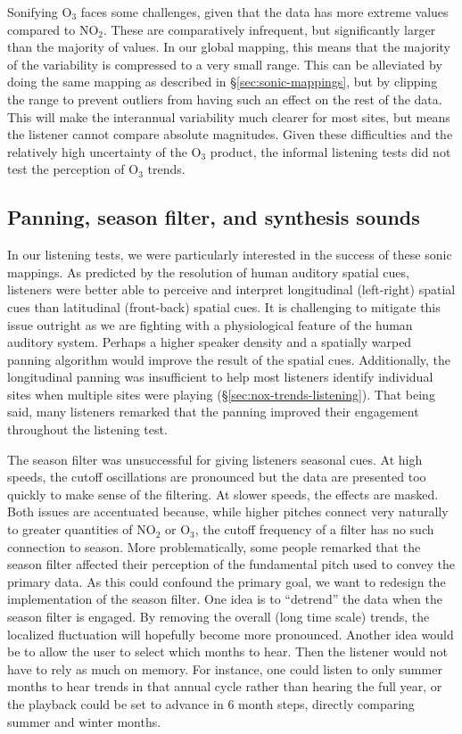 \documentclass[a4paper,10pt,oneside]{article}
\newcommand{\ce}[1]{$\mathrm{#1}$}
\begin{document}
\begin{sloppy}
Sonifying \ce{O_3} faces some challenges, given that the data has more extreme values compared to \ce{NO_2}. These are comparatively infrequent, but significantly larger than the majority of values.  In our global mapping, this means that the majority of the variability is compressed to a very small range. This can be alleviated by doing the same mapping as described in \S\ref{sec:sonic-mappings}, but by clipping the range to prevent outliers from having such an effect on the rest of the data.  This will make the interannual variability much clearer for most sites, but means the listener cannot compare absolute magnitudes. Given these difficulties and the relatively high uncertainty of the \ce{O_3} product, the informal listening tests did not test the perception of \ce{O_3} trends.

\subsection{Panning, season filter, and synthesis sounds}
In our listening tests, we were particularly interested in the success of these sonic mappings. As predicted by the resolution of human auditory spatial cues, listeners were better able to perceive and interpret longitudinal (left-right) spatial cues than latitudinal (front-back) spatial cues. It is challenging to mitigate this issue outright as we are fighting with a physiological feature of the human auditory system. Perhaps a higher speaker density and a spatially warped panning algorithm would improve the result of the spatial cues. Additionally, the longitudinal panning was insufficient to help most listeners identify individual sites when multiple sites were playing (\S\ref{sec:nox-trends-listening}).  That being said, many listeners remarked that the panning improved their engagement throughout the listening test.  

The season filter was unsuccessful for giving listeners seasonal cues. At high speeds, the cutoff oscillations are pronounced but the data are presented too quickly to make sense of the filtering. At slower speeds, the effects are masked. Both issues are accentuated because, while higher pitches connect very naturally to greater quantities of \ce{NO_2} or \ce{O_3}, the cutoff frequency of a filter has no such connection to season.  More problematically, some people remarked that the season filter affected their perception of the fundamental pitch used to convey the primary data. As this could confound the primary goal, we want to redesign the implementation of the season filter. One idea is to ``detrend'' the data when the season filter is engaged. By removing the overall (long time scale) trends, the localized fluctuation will hopefully become more pronounced. Another idea would be to allow the user to select which months to hear. Then the listener would not have to rely as much on memory.  For instance, one could listen to only summer months to hear trends in that  annual cycle rather than hearing the full year, or the playback could be set to advance in 6 month steps, directly comparing summer and winter months.   


\end{sloppy}
\end{document}
